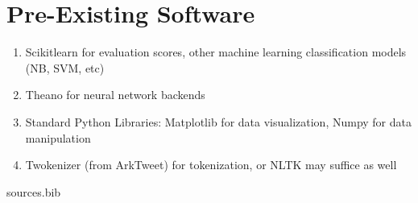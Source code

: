 \documentclass[10pt]{article}
\begin{document}




\section{Pre-Existing Software}

\begin{enumerate}
\item Scikitlearn for evaluation scores, other machine learning classification models (NB, SVM, etc)
\item Theano for neural network backends
\item Standard Python Libraries: Matplotlib for data visualization, Numpy for data manipulation
\item Twokenizer (from ArkTweet) for tokenization, or NLTK may suffice as well
\end{enumerate}

 {sources.bib} 

\end{document}
